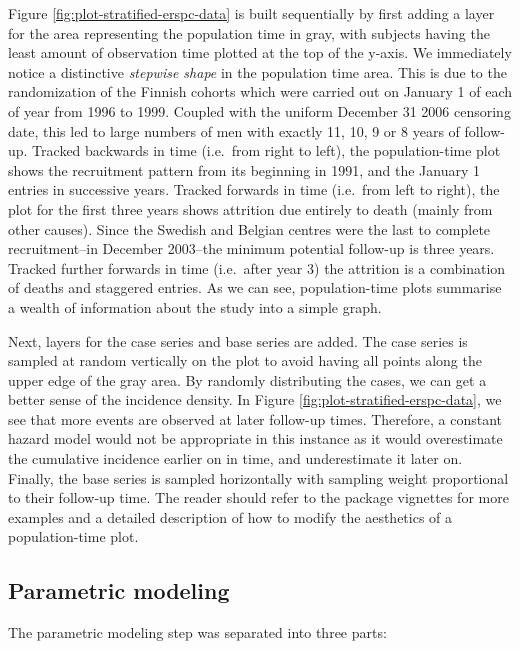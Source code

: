 \documentclass[
]{jss}
\begin{document}
Figure \ref{fig:plot-stratified-erspc-data} is built sequentially by
first adding a layer for the area representing the population time in
gray, with subjects having the least amount of observation time plotted
at the top of the y-axis. We immediately notice a distinctive
\emph{stepwise shape} in the population time area. This is due to the
randomization of the Finnish cohorts which were carried out on January 1
of each of year from 1996 to 1999. Coupled with the uniform December 31
2006 censoring date, this led to large numbers of men with exactly 11,
10, 9 or 8 years of follow-up. Tracked backwards in time (i.e.~from
right to left), the population-time plot shows the recruitment pattern
from its beginning in 1991, and the January 1 entries in successive
years. Tracked forwards in time (i.e.~from left to right), the plot for
the first three years shows attrition due entirely to death (mainly from
other causes). Since the Swedish and Belgian centres were the last to
complete recruitment--in December 2003--the minimum potential follow-up
is three years. Tracked further forwards in time (i.e.~after year 3) the
attrition is a combination of deaths and staggered entries. As we can
see, population-time plots summarise a wealth of information about the
study into a simple graph.

Next, layers for the case series and base series are added. The case
series is sampled at random vertically on the plot to avoid having all
points along the upper edge of the gray area. By randomly distributing
the cases, we can get a better sense of the incidence density. In Figure
\ref{fig:plot-stratified-erspc-data}, we see that more events are
observed at later follow-up times. Therefore, a constant hazard model
would not be appropriate in this instance as it would overestimate the
cumulative incidence earlier on in time, and underestimate it later on.
Finally, the base series is sampled horizontally with sampling weight
proportional to their follow-up time. The reader should refer to the
package vignettes for more examples and a detailed description of how to
modify the aesthetics of a population-time plot.

\hypertarget{parametric-modeling}{%
\subsection{Parametric modeling}\label{parametric-modeling}}

The parametric modeling step was separated into three parts:
\end{document}
